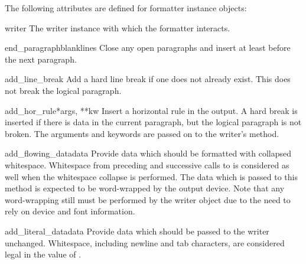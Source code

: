 The following attributes are defined for formatter instance objects:


\begin{memberdesc}[formatter]{writer}
The writer instance with which the formatter interacts.
\end{memberdesc}


\begin{methoddesc}[formatter]{end_paragraph}{blanklines}
Close any open paragraphs and insert at least 
before the next paragraph.
\end{methoddesc}

\begin{methoddesc}[formatter]{add_line_break}{}
Add a hard line break if one does not already exist.  This does not
break the logical paragraph.
\end{methoddesc}

\begin{methoddesc}[formatter]{add_hor_rule}{*args, **kw}
Insert a horizontal rule in the output.  A hard break is inserted if
there is data in the current paragraph, but the logical paragraph is
not broken.  The arguments and keywords are passed on to the writer's
 method.
\end{methoddesc}

\begin{methoddesc}[formatter]{add_flowing_data}{data}
Provide data which should be formatted with collapsed whitespace.
Whitespace from preceding and successive calls to
 is considered as well when the whitespace
collapse is performed.  The data which is passed to this method is
expected to be word-wrapped by the output device.  Note that any
word-wrapping still must be performed by the writer object due to the
need to rely on device and font information.
\end{methoddesc}

\begin{methoddesc}[formatter]{add_literal_data}{data}
Provide data which should be passed to the writer unchanged.
Whitespace, including newline and tab characters, are considered legal
in the value of .  
\end{methoddesc}

